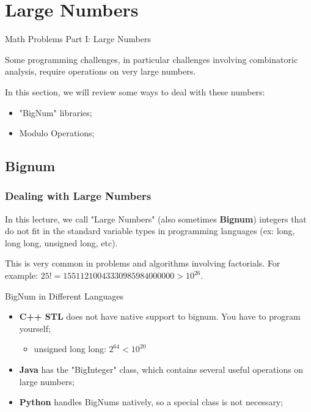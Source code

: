 
\section{Large Numbers}

\begin{frame}{Math Problems Part I: Large Numbers}

  Some programming challenges, in particular challenges involving combinatoric analysis, require operations on very large numbers.\bigskip

  In this section, we will review some ways to deal with these numbers:
  \begin{itemize}
    \item "BigNum" libraries;
    \item Modulo Operations;
  \end{itemize}
\end{frame}

\subsection{Bignum}
\begin{frame}
  \frametitle{Dealing with Large Numbers}

  In this lecture, we call "Large Numbers" (also sometimes {\bf Bignum}) integers that do not fit in the standard variable types in programming languages (ex: long, long long, unsigned long, etc).\bigskip

  This is very common in problems and algorithms involving factorials. For example: $25! = 15511210043330985984000000 > 10^{26}$.\bigskip

  \begin{block}{BigNum in Different Languages}
    \begin{itemize}
      \item {\bf C++ STL} does not have native support to bignum. You have to program yourself;
      \begin{itemize}
        \item unsigned long long: $2^{64} < 10^{20}$
      \end{itemize}
      \item {\bf Java} has the "BigInteger" class, which contains several useful operations on large numbers;
      \item {\bf Python} handles BigNums natively, so a special class is not necessary;
    \end{itemize}
  \end{block}
\end{frame}

